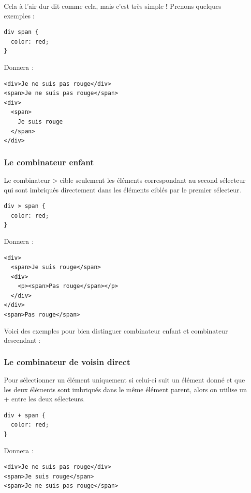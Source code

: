 \documentclass[a4paper]{article}
\begin{document}
Cela à l'air dur dit comme cela, mais c'est très simple ! Prenons quelques exemples :
\begin{verbatim}
div span {
  color: red;
}
\end{verbatim}
Donnera :
\begin{verbatim}
<div>Je ne suis pas rouge</div>
<span>Je ne suis pas rouge</span>
<div>
  <span>
    Je suis rouge
  </span>
</div>
\end{verbatim}
\subsubsection{Le combinateur enfant}
Le combinateur > cible seulement les éléments correspondant au second sélecteur qui sont imbriqués directement dans les éléments ciblés par le premier sélecteur.
\begin{verbatim}
div > span {
  color: red;
}
\end{verbatim}
Donnera :
\begin{verbatim}
<div>
  <span>Je suis rouge</span>
  <div>
    <p><span>Pas rouge</span></p>
  </div>
</div>
<span>Pas rouge</span>
\end{verbatim}
Voici des exemples pour bien distinguer combinateur enfant et combinateur descendant :


\subsubsection{Le combinateur de voisin direct}
Pour sélectionner un élément uniquement si celui-ci suit un élément donné et que les deux éléments sont imbriqués dans le même élément parent, alors on utilise un + entre les deux sélecteurs.
\begin{verbatim}
div + span {
  color: red;
}
\end{verbatim}
Donnera :
\begin{verbatim}
<div>Je ne suis pas rouge</div>
<span>Je suis rouge</span>
<span>Je ne suis pas rouge</span>
\end{verbatim}
\end{document}
